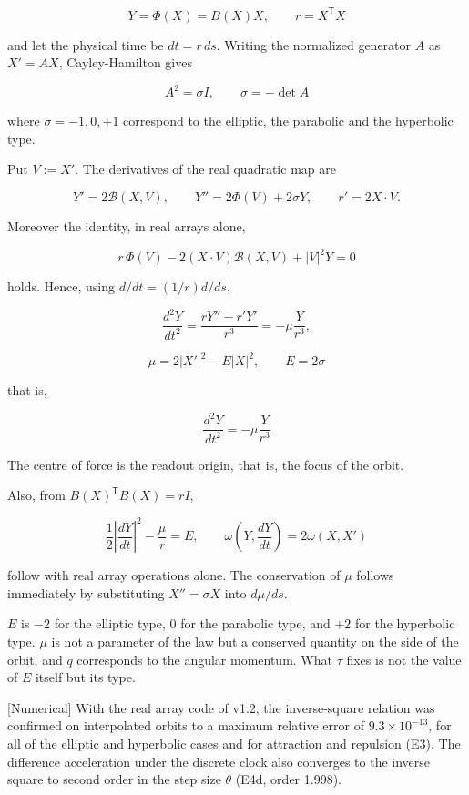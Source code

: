 \documentclass[
  a4paper,
]{article}
\begin{document}
\[
Y=\Phi(X)=B(X)X,\qquad r=X^{\mathsf T}X
\]

and let the physical time be \(dt=r\,ds\). Writing the normalized
generator \(A\) as \(X'=AX\), Cayley-Hamilton gives

\[
A^2=\sigma I,\qquad \sigma=-\det A
\]

where \(\sigma=-1,0,+1\) correspond to the elliptic, the parabolic and
the hyperbolic type.

Put \(V:=X'\). The derivatives of the real quadratic map are

\[
Y'=2\mathcal B(X,V),\qquad
Y''=2\Phi(V)+2\sigma Y,
\qquad
r'=2X\cdot V.
\]

Moreover the identity, in real arrays alone,

\[
\boxed{\;r\,\Phi(V)-2(X\cdot V)\mathcal B(X,V)+\lvert V\rvert^2Y=0\;}
\]

holds. Hence, using \(d/dt=(1/r)d/ds\),

\[
\frac{d^2Y}{dt^2}
=\frac{rY''-r'Y'}{r^3}
=-\mu\frac{Y}{r^3},
\]

\[
\boxed{\;\mu=2\lvert X'\rvert^2-E\lvert X\rvert^2,\qquad E=2\sigma\;}
\]

that is,

\[
\boxed{\;\frac{d^2Y}{dt^2}=-\mu\frac{Y}{r^3}\;}
\]

The centre of force is the readout origin, that is, the focus of the
orbit.

Also, from \(B(X)^{\mathsf T}B(X)=rI\),

\[
\frac12\left\lvert\frac{dY}{dt}\right\rvert^2-\frac{\mu}{r}=E,
\qquad
\omega\!\left(Y,\frac{dY}{dt}\right)=2\omega(X,X')
\]

follow with real array operations alone. The conservation of \(\mu\)
follows immediately by substituting \(X''=\sigma X\) into \(d\mu/ds\).

\(E\) is \(-2\) for the elliptic type, \(0\) for the parabolic type, and
\(+2\) for the hyperbolic type. \(\mu\) is not a parameter of the law
but a conserved quantity on the side of the orbit, and \(q\) corresponds
to the angular momentum. What \(\tau\) fixes is not the value of \(E\)
itself but its type.

{[}Numerical{]} With the real array code of v1.2, the inverse-square
relation was confirmed on interpolated orbits to a maximum relative
error of \(9.3\times10^{-13}\), for all of the elliptic and hyperbolic
cases and for attraction and repulsion (E3). The difference acceleration
under the discrete clock also converges to the inverse square to second
order in the step size \(\theta\) (E4d, order 1.998).
\end{document}
